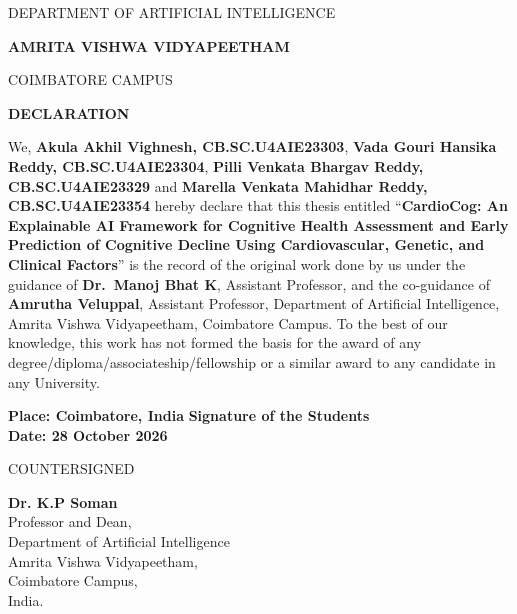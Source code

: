 \documentclass[12pt,a4paper,oneside]{report}
\newcommand{\thesistitle}{CardioCog: An Explainable AI Framework for Cognitive Health Assessment and Early Prediction of Cognitive Decline Using Cardiovascular, Genetic, and Clinical Factors}
\newcommand{\guide}{Dr.~Manoj Bhat K}
\newcommand{\guidedesig}{Assistant Professor}
\newcommand{\coguide}{Amrutha Veluppal}
\newcommand{\coguidedesig}{Assistant Professor}
\begin{document}
\begin{center}
DEPARTMENT OF ARTIFICIAL INTELLIGENCE\par
{\large\bfseries AMRITA VISHWA VIDYAPEETHAM\par}
COIMBATORE CAMPUS\par
\vspace{2.6cm}
{\large\bfseries DECLARATION\par}
\end{center}
\vspace{0.5cm}
\noindent We, \textbf{Akula Akhil Vighnesh, CB.SC.U4AIE23303}, \textbf{Vada Gouri Hansika Reddy, CB.SC.U4AIE23304}, \textbf{Pilli Venkata Bhargav Reddy, CB.SC.U4AIE23329} and \textbf{Marella Venkata Mahidhar Reddy, CB.SC.U4AIE23354} hereby declare that this thesis entitled ``\textbf{\thesistitle}'' is the record of the original work done by us under the guidance of \textbf{\guide}, \guidedesig, and the co-guidance of \textbf{\coguide}, \coguidedesig, Department of Artificial Intelligence, Amrita Vishwa Vidyapeetham, Coimbatore Campus. To the best of our knowledge, this work has not formed the basis for the award of any degree/diploma/associateship/fellowship or a similar award to any candidate in any University.

\vspace{1.8cm}
\noindent\textbf{Place: Coimbatore, India} \hfill \textbf{Signature of the Students}\\
\textbf{Date: 28 October 2026}

\vspace{2.4cm}
\begin{center}
COUNTERSIGNED\par
\vspace{2.0cm}
\textbf{Dr. K.P Soman}\\
Professor and Dean,\\
Department of Artificial Intelligence\\
Amrita Vishwa Vidyapeetham,\\
Coimbatore Campus,\\
India.
\end{center}
\newpage

\setcounter{page}{1}
\tableofcontents
\clearpage


\clearpage
{}
\setcounter{page}{1}











\appendix


\cleardoublepage
{}
{}


\end{document}
